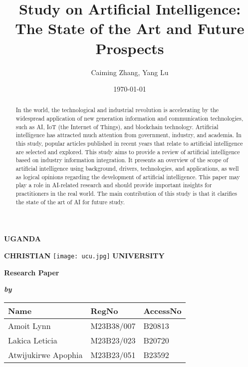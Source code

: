 \documentclass[12pt, a4paper]{article}
\begin{document}
\begin{center}

{\Large \textbf{UGANDA }}
\vspace{0.2cm}

{\Large \textbf{CHRISTIAN} \hspace{0.2cm} \texttt{[image: ucu.jpg]}
\hspace{0.2cm} \textbf{UNIVERSITY}}
\vspace{4cm}

{\LARGE \textbf{Research Paper}}
\vspace{2cm}
\end{center}

\begin{center}
\textbf{\textit{by}}
\vspace{1cm}
\end{center}

\begin{center}

\begin{tabular}{|l|l|l|}
\hline
\textbf{Name} & \textbf{RegNo} & \textbf{AccessNo} \\ \hline
Amoit Lynn & M23B38/007 & B20813 \\ \hline
Lakica Leticia & M23B23/023 & B20720 \\ \hline
Atwijukirwe Apophia & M23B23/051 & B23592 \\ \hline
\end{tabular}

\end{center}

\newpage

\title{Study on Artificial Intelligence: The State of the Art and Future Prospects}
\author{Caiming Zhang, Yang Lu}
\date{\today}
\maketitle

\begin{abstract}
In the world, the technological and industrial revolution is accelerating by the widespread application of new generation information and communication technologies, such as AI, IoT (the Internet of Things), and blockchain technology. Artificial intelligence has attracted much attention from government, industry, and academia. In this study, popular articles published in recent years that relate to artificial intelligence are selected and explored. This study aims to provide a review of artificial intelligence based on industry information integration. It presents an overview of the scope of artificial intelligence using background, drivers, technologies, and applications, as well as logical opinions regarding the development of artificial intelligence. This paper may play a role in AI-related research and should provide important insights for practitioners in the real world. The main contribution of this study is that it clarifies the state of the art of AI for future study.
\end{abstract}
\end{document}
